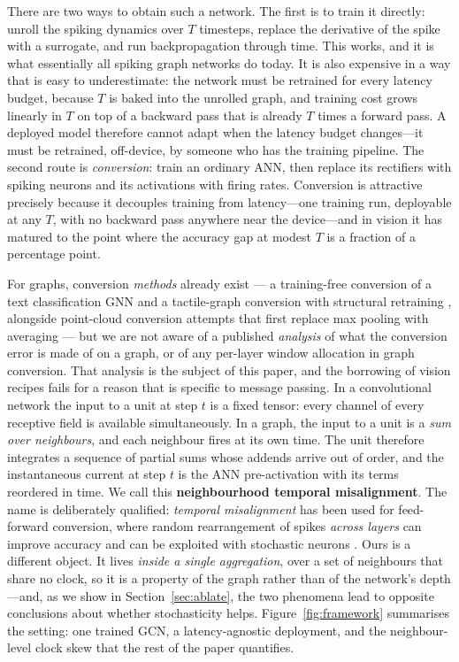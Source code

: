 \documentclass[10pt,twocolumn]{article}
\newcommand{\figref}[1]{Figure~\ref{#1}}
\newcommand{\secref}[1]{Section~\ref{#1}}
\begin{document}
There are two ways to obtain such a network. The first is to train it directly: unroll the spiking
dynamics over $T$ timesteps, replace the derivative of the spike with a surrogate, and run
backpropagation through time. This works, and it is what essentially all spiking graph networks do
today. It is also expensive in a way that is easy to underestimate: the network must be retrained
for every latency budget, because $T$ is baked into the unrolled graph, and training cost grows
linearly in $T$ on top of a backward pass that is already $T$ times a forward pass. A deployed model
therefore cannot adapt when the latency budget changes---it must be retrained, off-device, by
someone who has the training pipeline. The second route is \emph{conversion}: train an ordinary ANN,
then replace its rectifiers with spiking neurons and its activations with firing rates. Conversion is
attractive precisely because it decouples training from latency---one training run, deployable at
any $T$, with no backward pass anywhere near the device---and in vision it has matured to the point
where the accuracy gap at modest $T$ is a fraction of a percentage point.

For graphs, conversion \emph{methods} already exist --- a training-free conversion of a text
classification GNN \citep{hwang2024onespike} and a tactile-graph conversion with structural
retraining \citep{zhang2025quantization}, alongside point-cloud conversion attempts that first replace max
pooling with averaging --- but we are not aware of a published \emph{analysis} of what the
conversion error is made of on a graph, or of any per-layer window allocation in graph conversion.
That analysis is
the subject of this paper, and the borrowing of vision recipes fails for a reason that
is specific to message passing. In a convolutional network the input to a unit at step $t$ is a
fixed tensor: every channel of every receptive field is available simultaneously. In a graph, the
input to a unit is a \emph{sum over neighbours}, and each neighbour fires at its own time. The unit
therefore integrates a sequence of partial sums whose addends arrive out of order, and the
instantaneous current at step $t$ is the ANN pre-activation with its terms reordered in time. We
call this \textbf{neighbourhood temporal misalignment}. The name is deliberately qualified:
\emph{temporal misalignment} has been used for feed-forward conversion, where random rearrangement
of spikes \emph{across layers} can improve accuracy and can be exploited with stochastic neurons
\citep{bojkovic2025temporal}. Ours is a different object. It lives \emph{inside a single
aggregation}, over a set of neighbours that share no clock, so it is a property of the graph rather
than of the network's depth---and, as we show in \secref{sec:ablate}, the two phenomena lead to
opposite conclusions about whether stochasticity helps. \figref{fig:framework} summarises the
setting: one trained GCN, a latency-agnostic deployment, and the neighbour-level clock skew that the
rest of the paper quantifies.
\end{document}
